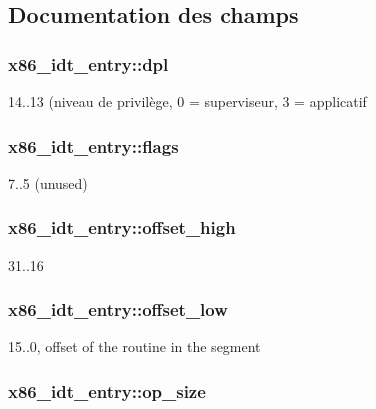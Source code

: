 \subsection{Documentation des champs}
\hypertarget{structx86__idt__entry_a5c0f7af9139df1e94d0c6d17dcd0fb66}{
\subsubsection[{dpl}]{ x86\-\_\-idt\-\_\-entry\-::dpl}}\label{structx86__idt__entry_a5c0f7af9139df1e94d0c6d17dcd0fb66}
14..13 (niveau de privilège, 0 = superviseur, 3 = applicatif \hypertarget{structx86__idt__entry_af0ce23f490bcc54f41c3710ab6433786}{
\subsubsection[{flags}]{ x86\-\_\-idt\-\_\-entry\-::flags}}\label{structx86__idt__entry_af0ce23f490bcc54f41c3710ab6433786}
7..5 (unused) \hypertarget{structx86__idt__entry_a0206c9a35f101b3cc450fce405df1c0e}{
\subsubsection[{offset\-\_\-high}]{ x86\-\_\-idt\-\_\-entry\-::offset\-\_\-high}}\label{structx86__idt__entry_a0206c9a35f101b3cc450fce405df1c0e}
31..16 \hypertarget{structx86__idt__entry_a7efe04d7c37c746487da6d2ae5349525}{
\subsubsection[{offset\-\_\-low}]{ x86\-\_\-idt\-\_\-entry\-::offset\-\_\-low}}\label{structx86__idt__entry_a7efe04d7c37c746487da6d2ae5349525}
15..0, offset of the routine in the segment \hypertarget{structx86__idt__entry_a58f211f10555adac756847fa46a0c856}{
\subsubsection[{op\-\_\-size}]{ x86\-\_\-idt\-\_\-entry\-::op\-\_\-size}}\label{structx86__idt__entry_a58f211f10555adac756847fa46a0c856}
